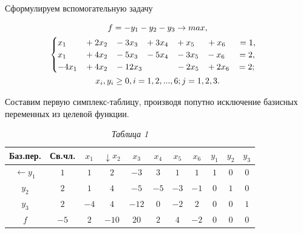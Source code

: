 Сформулируем вспомогательную задачу

\begin{gather*}
f=-y_{1}-y_{2}-y_{3}\rightarrow max,\\
\begin{cases}
x_{1}\hspace{7,5mm} +2x_{2}\hspace{3mm} -3x_{3}\hspace{3mm} +3x_{4}\hspace{3mm} +x_{5}\hspace{5mm} +x_{6}\hspace{5mm} = 1,\\
x_{1}\hspace{7,5mm} +4x_{2}\hspace{3mm} -5x_{3}\hspace{3mm} -5x_{4}\hspace{3mm} -3x_{5}\hspace{3mm} -x_{6}\hspace{5mm} = 2,\\
-4x_{1}\hspace{3mm} +4x_{2}\hspace{3mm} -12x_{3}\hspace{14mm}    -2x_{5}\hspace{3mm} +2x_{6}\hspace{3mm} = 2;
\end{cases}\\
x_{i},y_{i}\geq0, i=1,2,...,6; j=1,2,3.
\end{gather*}

Составим первую симплекс-таблицу, производя попутно исключение базисных переменных из целевой функции.

\begin{table}[h]
\caption*{\hspace{0.8\linewidth} \textit{Таблица 1}}
\begin{center}
\renewcommand{\tabcolsep}{7pt}
\begin{tabular}{ | c | c | c | c | c | c | c | c | c | c | c | }
\hline
Баз.пер. & Св.чл. & $x_{1}$ & $\downarrow x_{2}$ & $x_{3}$ & $x_{4}$ & $x_{5}$ & $x_{6}$ & $y_{1}$ & $y_{2}$ & $y_{3}$ \\ \hline
$\leftarrow y_{1}$ & $1$ & $1$ & \cellcolor{Gray}$2$ & $-3$ & $3$ & $1$ & $1$ & $1$ & $0$ & $0$ \\ \hline
$y_{2}$ & $2$ & $1$ & $4$ & $-5$ & $-5$ & $-3$ & $-1$ & $0$ & $1$ & $0$ \\ \hline
$y_{3}$ & $2$ & $-4$ & $4$ & $-12$ & $0$ & $-2$ & $2$ & $0$ & $0$ & $1$\\ \hline
$f$ & $-5$ & $2$ & $-10$ & $20$ & $2$ & $4$ & $-2$ & $0$ & $0$ & $0$ \\ \hline
\end{tabular}
\end{center}
\end{table}

